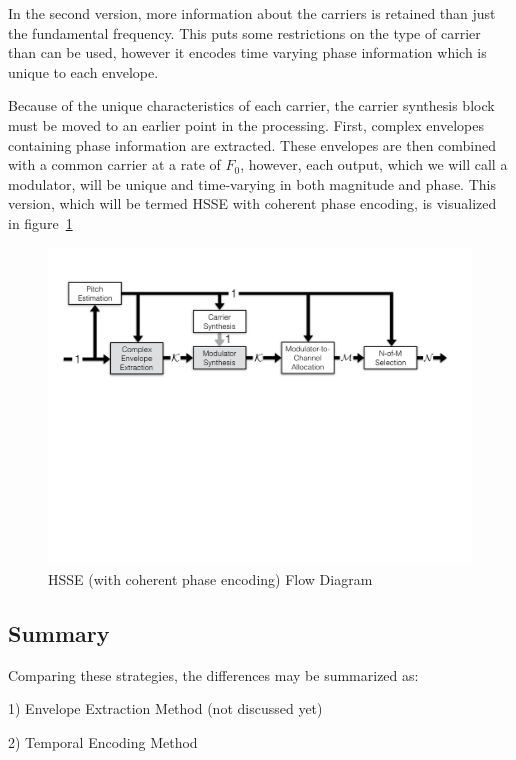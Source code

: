 \documentclass [11pt, proquest,oneside] {ganter_thesis}[2015/03/03]
\begin{document}
In the second version, more information about the carriers is retained than just the fundamental frequency.  This puts some restrictions on the type of carrier than can be used, however it encodes time varying phase information which is unique to each envelope.

Because of the unique characteristics of each carrier, the carrier synthesis block must be moved to an earlier point in the processing.  First, complex envelopes containing phase information are extracted.  These envelopes are then combined with a common carrier at a rate of $F_0$, however, each output, which we will call a modulator, will be unique and time-varying in both magnitude and phase.  This version, which will be termed HSSE with coherent phase encoding, is visualized in figure~\ref{fig:HSSE_flow_2}

\begin{figure}[!ht]
  \centering
    \includegraphics[width=1\textwidth]{HSSE_flow_diagram_Phase}   
    \caption{HSSE (with coherent phase encoding) Flow Diagram}\label{fig:HSSE_flow_2}
\end{figure}

\subsection{Summary}

Comparing these strategies, the differences may be summarized as:


1) Envelope Extraction Method (not discussed yet)

2) Temporal Encoding Method
\end{document}
